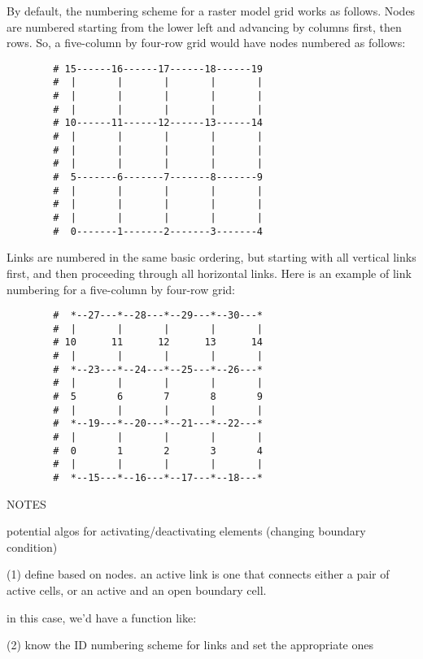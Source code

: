 \documentclass[12pt]{amsart}
\begin{document}
By default, the numbering scheme for a raster model grid works as follows. Nodes are numbered starting from the lower left and advancing by columns first, then rows. So, a five-column by four-row grid would have nodes numbered as follows:
\newpage
\begin{verbatim}
        # 15------16------17------18------19
        #  |       |       |       |       |
        #  |       |       |       |       |
        #  |       |       |       |       |
        # 10------11------12------13------14
        #  |       |       |       |       |
        #  |       |       |       |       |   
        #  |       |       |       |       |
        #  5-------6-------7-------8-------9
        #  |       |       |       |       |
        #  |       |       |       |       |
        #  |       |       |       |       |
        #  0-------1-------2-------3-------4
\end{verbatim}

Links are numbered in the same basic ordering, but starting with all vertical links first, and then proceeding through all horizontal links. Here is an example of link numbering for a five-column by four-row grid:

\begin{verbatim}
        #  *--27---*--28---*--29---*--30---*
        #  |       |       |       |       |
        # 10      11      12      13      14
        #  |       |       |       |       |
        #  *--23---*--24---*--25---*--26---*
        #  |       |       |       |       |
        #  5       6       7       8       9   
        #  |       |       |       |       |
        #  *--19---*--20---*--21---*--22---*
        #  |       |       |       |       |
        #  0       1       2       3       4
        #  |       |       |       |       |
        #  *--15---*--16---*--17---*--18---*
\end{verbatim}


NOTES

potential algos for activating/deactivating elements (changing boundary condition)

(1) define based on nodes. an active link is one that connects either a pair of active cells, or an active and an open boundary cell.

in this case, we'd have a function like:

%	
			
(2) know the ID numbering scheme for links and set the appropriate ones

	
			
\end{document}
